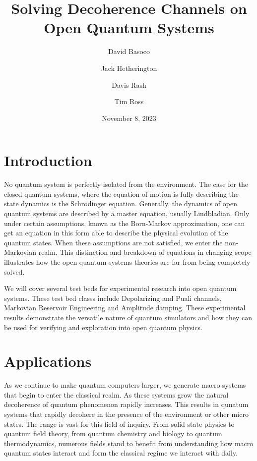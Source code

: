 \documentclass[12pt]{article}
\title{Solving Decoherence Channels on Open Quantum Systems}
\author{David Basoco \and Jack Hetherington \and Davis Rash \and Tim Ross}
\date{November 8, 2023}
\begin{document}
  \maketitle

  \section{Introduction}
  No quantum system is perfectly isolated from the environment. The case for the closed quantum systems, where the equation of motion is fully describing the state dynamics is the Schr\"{o}dinger equation. Generally, the dynamics of open quantum systems are described by a master equation, usually Lindbladian. Only under certain assumptions, known as the Born-Markov approximation, one can get an equation in this form able to describe the physical evolution of the quantum states. When these assumptions are not satisfied, we enter the non-Markovian realm. This distinction and breakdown of equations in changing scope illustrates how the open quantum systems theories are far from being completely solved.  

  We will cover several test beds for experimental research into open quantum systems. These test bed classs include Depolarizing and Puali channels, Markovian Reservoir Engineering and Amplitude damping. These experimental results demonstrate the versatile nature of quantum simulators and how they can be used for verifying and exploration into open quantum physics. 
  \blindtext

  \section{Applications}
  As we continue to make quantum computers larger, we generate macro systems that begin to enter the classical realm. As these systems grow the natural decoherence of quantum phenomenon rapidly increases. This results in qunatum systems that rapidly decohere in the presence of the environment or other micro states. The range is vast for this field of inquiry. From solid state physics to quantum field theory, from quantum chemistry and biology to quantum thermodynamics, numerous fields stand to benefit from understanding how macro quantum states interact and form the classical regime we interact with daily.
  \blindtext
\end{document}
